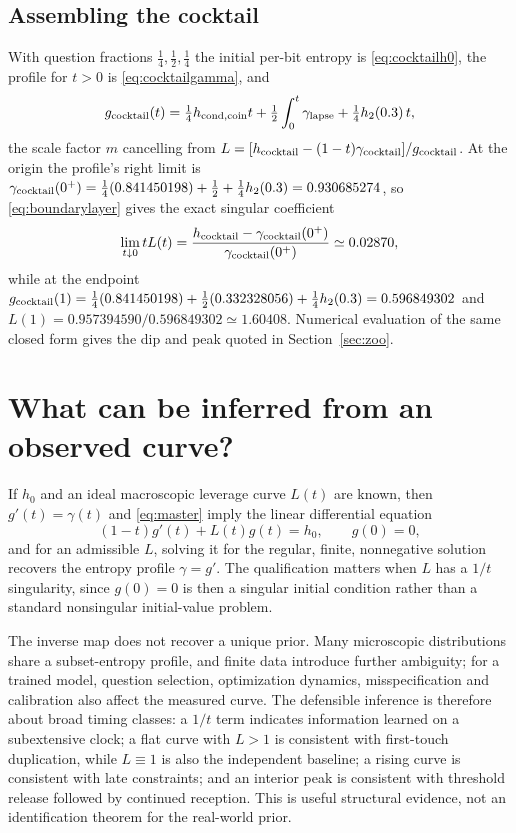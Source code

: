 \subsection{Assembling the cocktail}

With question fractions $\tfrac14,\tfrac12,\tfrac14$ the initial
per-bit entropy is \eqref{eq:cocktailh0}, the profile for $t>0$ is
\eqref{eq:cocktailgamma}, and
%
\begin{equation}
  g_{\rm cocktail}(t)
  = \tfrac14 h_{\rm cond,coin}t
  + \tfrac12\int_0^t\gamma_{\rm lapse}
  + \tfrac14 h_2(0.3)\,t,
  \label{eq:appcocktailg}
\end{equation}
%
the scale factor $m$ cancelling from
$L = [h_{\rm cocktail}-(1-t)\gamma_{\rm cocktail}]/g_{\rm cocktail}$.
At the origin the profile's right limit is
$\gamma_{\rm cocktail}(0^+) = \tfrac14(0.841450198)+\tfrac12
+\tfrac14h_2(0.3) = 0.930685274$, so \eqref{eq:boundarylayer} gives
the exact singular coefficient
%
\begin{equation}
  \lim_{t\downarrow0}tL(t)
  = \frac{h_{\rm cocktail}-\gamma_{\rm cocktail}(0^+)}
         {\gamma_{\rm cocktail}(0^+)}
  \simeq 0.02870 ,
  \label{eq:appcocktailsing}
\end{equation}
%
while at the endpoint
$g_{\rm cocktail}(1) = \tfrac14(0.841450198)
+\tfrac12(0.332328056)+\tfrac14h_2(0.3) = 0.596849302$ and
$L(1) = 0.957394590/0.596849302 \simeq 1.60408$. Numerical
evaluation of the same closed form gives the dip and peak quoted in
Section~\ref{sec:zoo}.

\section{What can be inferred from an observed
curve?}\label{app:inverse}

If $h_0$ and an ideal macroscopic leverage curve $L(t)$ are known,
then $g'(t) = \gamma(t)$ and \eqref{eq:master} imply the linear
differential equation
%
\begin{equation}
  (1-t)g'(t) + L(t)g(t) = h_0,
  \qquad g(0) = 0,
  \label{eq:appinverse}
\end{equation}
%
and for an admissible $L$, solving it for the regular, finite,
nonnegative solution recovers the entropy profile $\gamma = g'$. The
qualification matters when $L$ has a $1/t$ singularity, since
$g(0) = 0$ is then a singular initial condition rather than a
standard nonsingular initial-value problem.

The inverse map does not recover a unique prior. Many microscopic
distributions share a subset-entropy profile, and finite data
introduce further ambiguity; for a trained model, question selection,
optimization dynamics, misspecification and calibration also affect
the measured curve. The defensible inference is therefore about broad
timing classes: a $1/t$ term indicates information learned on a
subextensive clock; a flat curve with $L>1$ is consistent with
first-touch duplication, while $L\equiv1$ is also the independent
baseline; a rising curve is consistent with late constraints; and an
interior peak is consistent with threshold release followed by
continued reception. This is useful structural evidence, not an
identification theorem for the real-world prior.

